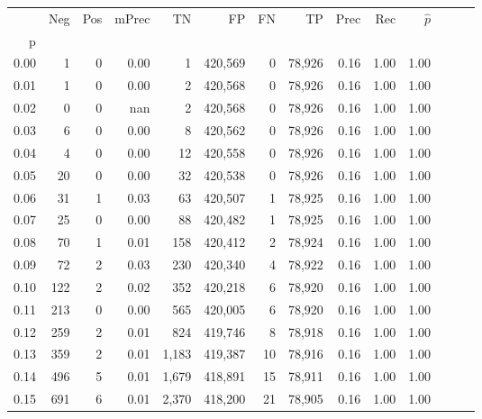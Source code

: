 \begin{tabular}{rrrrrrrrrrrrrr}
\toprule
{} &     Neg &    Pos & mPrec &       TN &       FP &      FN &      TP &  Prec &   Rec & $\hat{p}$ \\
p    &         &        &       &          &          &         &         &       &       &           \\
\midrule
0.00 &       1 &      0 &  0.00 &        1 &  420,569 &       0 &  78,926 &  0.16 &  1.00 &      1.00 \\
0.01 &       1 &      0 &  0.00 &        2 &  420,568 &       0 &  78,926 &  0.16 &  1.00 &      1.00 \\
0.02 &       0 &      0 &   nan &        2 &  420,568 &       0 &  78,926 &  0.16 &  1.00 &      1.00 \\
0.03 &       6 &      0 &  0.00 &        8 &  420,562 &       0 &  78,926 &  0.16 &  1.00 &      1.00 \\
0.04 &       4 &      0 &  0.00 &       12 &  420,558 &       0 &  78,926 &  0.16 &  1.00 &      1.00 \\
0.05 &      20 &      0 &  0.00 &       32 &  420,538 &       0 &  78,926 &  0.16 &  1.00 &      1.00 \\
0.06 &      31 &      1 &  0.03 &       63 &  420,507 &       1 &  78,925 &  0.16 &  1.00 &      1.00 \\
0.07 &      25 &      0 &  0.00 &       88 &  420,482 &       1 &  78,925 &  0.16 &  1.00 &      1.00 \\
0.08 &      70 &      1 &  0.01 &      158 &  420,412 &       2 &  78,924 &  0.16 &  1.00 &      1.00 \\
0.09 &      72 &      2 &  0.03 &      230 &  420,340 &       4 &  78,922 &  0.16 &  1.00 &      1.00 \\
0.10 &     122 &      2 &  0.02 &      352 &  420,218 &       6 &  78,920 &  0.16 &  1.00 &      1.00 \\
0.11 &     213 &      0 &  0.00 &      565 &  420,005 &       6 &  78,920 &  0.16 &  1.00 &      1.00 \\
0.12 &     259 &      2 &  0.01 &      824 &  419,746 &       8 &  78,918 &  0.16 &  1.00 &      1.00 \\
0.13 &     359 &      2 &  0.01 &    1,183 &  419,387 &      10 &  78,916 &  0.16 &  1.00 &      1.00 \\
0.14 &     496 &      5 &  0.01 &    1,679 &  418,891 &      15 &  78,911 &  0.16 &  1.00 &      1.00 \\
0.15 &     691 &      6 &  0.01 &    2,370 &  418,200 &      21 &  78,905 &  0.16 &  1.00 &      1.00 \\

\end{tabular}

